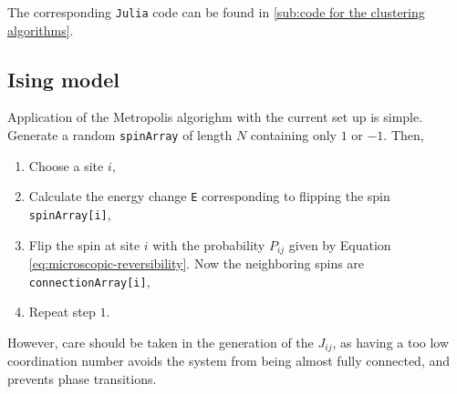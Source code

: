 The corresponding \texttt{Julia} code can be found in \ref{sub:code for the clustering algorithms}.

% 
%
%

\subsection{Ising model}%
\label{sub:Ising model}

Application of the Metropolis algorighm with the current set up is simple. Generate a random \texttt{spinArray} of length $N$ containing only  $1$ or  $-1$. Then,
\begin{enumerate}
	\item Choose a site $i$,
	\item Calculate the energy change \texttt{E} corresponding to flipping the spin \texttt{spinArray[i]},
	\item Flip the spin at site $i$ with the probability $P_{ij}$ given by Equation \eqref{eq:microscopic-reversibility}. Now the neighboring spins are \texttt{connectionArray[i]},
	\item Repeat step $1$.
\end{enumerate}

However, care should be taken in the generation of the $J_{ij}$, as having a too low coordination number avoids the system from being almost fully connected, and prevents phase transitions.
